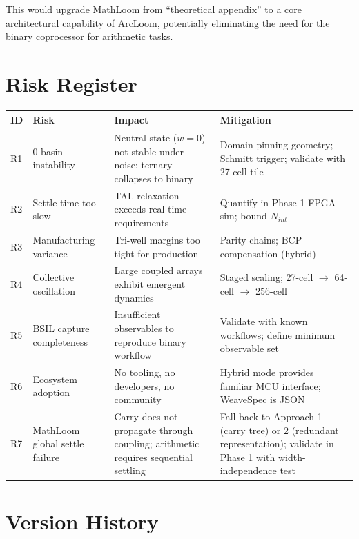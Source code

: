 \documentclass[11pt, a4paper]{report}
\begin{document}
This would upgrade MathLoom from ``theoretical appendix'' to a core
architectural capability of ArcLoom, potentially eliminating the need
for the binary coprocessor for arithmetic tasks.

\chapter{Risk Register}

\begin{longtable}{@{}p{1cm}p{3.5cm}p{5cm}p{4cm}@{}}
\toprule
\textbf{ID} & \textbf{Risk} & \textbf{Impact} & \textbf{Mitigation} \\
\midrule
\endhead
R1 & 0-basin instability & Neutral state ($w=0$) not stable under noise;
      ternary collapses to binary & Domain pinning geometry;
      Schmitt trigger; validate with 27-cell tile \\
R2 & Settle time too slow & TAL relaxation exceeds real-time requirements &
     Quantify in Phase 1 FPGA sim; bound $N_{int}$ \\
R3 & Manufacturing variance & Tri-well margins too tight for
     production & Parity chains; BCP compensation (hybrid) \\
R4 & Collective oscillation & Large coupled arrays exhibit emergent
     dynamics & Staged scaling; 27-cell $\to$ 64-cell $\to$ 256-cell \\
R5 & BSIL capture completeness & Insufficient observables to reproduce
     binary workflow & Validate with known workflows; define minimum
     observable set \\
R6 & Ecosystem adoption & No tooling, no developers, no community &
     Hybrid mode provides familiar MCU interface; WeaveSpec is JSON \\
R7 & MathLoom global settle failure & Carry does not propagate through
     coupling; arithmetic requires sequential settling &
     Fall back to Approach 1 (carry tree) or 2 (redundant representation);
     validate in Phase 1 with width-independence test \\
\bottomrule
\end{longtable}

\chapter{Version History}
\end{document}
